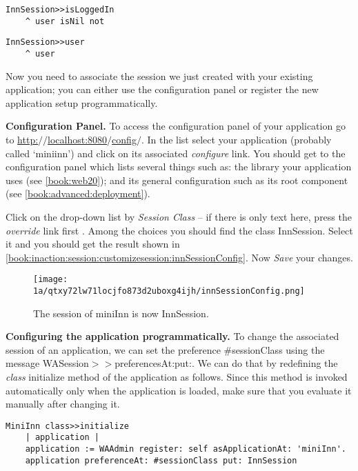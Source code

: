 \documentclass[a4paper,10pt,twoside]{book}
\newcommand{\ct}[1]{{\small\ttfamily\textup{#1}}}
\begin{document}
\begin{lstlisting}
InnSession>>isLoggedIn
    ^ user isNil not
\end{lstlisting}

\begin{lstlisting}
InnSession>>user
    ^ user
\end{lstlisting}

Now you need to associate the session we just created with your existing application; you can either use the configuration panel or register the new application setup programmatically.

\textbf{Configuration Panel.} To access the configuration panel of your application go to \href{http://localhost:8080/config/}{http:$/$$/$localhost:8080$/$config$/$}. In the list select your application (probably called `miniinn') and click on its associated \textit{configure} link. You should get to the configuration panel which lists several things such as: the library your application uses (see \autoref{book:web20}); and its general configuration such as its root component (see \autoref{book:advanced:deployment}).  

Click on the drop-down list by \textit{Session Class} -- if there is only text here, press the \textit{override} link first . Among the choices you should find the class \ct{InnSession}. Select it and you should get the result shown in \autoref{book:inaction:session:customizesession:innSessionConfig}. Now \textit{Save} your changes.

\begin{figure}[h!tbp]
	\begin{center}
		\texttt{[image: 1a/qtxy72lw71locjfo873d2uboxg4ijh/innSessionConfig.png]}
		\caption{The session of miniInn is now InnSession.\label{book:inaction:session:customizesession:innSessionConfig}}
	\end{center}
\end{figure}


\textbf{Configuring the application programmatically.} To change the associated session of an application, we can set the preference \ct{\#sessionClass} using the message \ct{WASession$>$$>$preferencesAt:put:}. We can do that by redefining the \textit{class} \ct{initialize} method of the application as follows. Since this method is invoked automatically only when the application is loaded, make sure that you evaluate it manually after changing it.

\begin{lstlisting}
MiniInn class>>initialize
    | application |
    application := WAAdmin register: self asApplicationAt: 'miniInn'.
    application preferenceAt: #sessionClass put: InnSession
\end{lstlisting}
\end{document}

